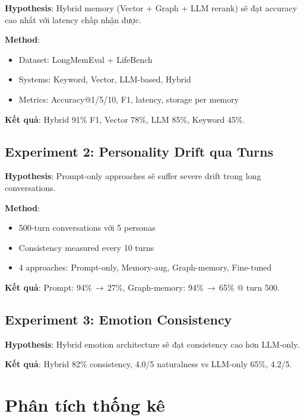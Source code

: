 \documentclass[10pt,leqno]{amsart}
\begin{document}
\textbf{Hypothesis}: Hybrid memory (Vector + Graph + LLM rerank) sẽ đạt accuracy cao nhất với latency chấp nhận được.

\textbf{Method}:
\begin{itemize}
    \item Dataset: LongMemEval + LifeBench
    \item Systems: Keyword, Vector, LLM-based, Hybrid
    \item Metrics: Accuracy@1/5/10, F1, latency, storage per memory
\end{itemize}

\textbf{Kết quả}: Hybrid 91\% F1, Vector 78\%, LLM 85\%, Keyword 45\%.

\subsection{Experiment 2: Personality Drift qua Turns}

\textbf{Hypothesis}: Prompt-only approaches sẽ suffer severe drift trong long conversations.

\textbf{Method}:
\begin{itemize}
    \item 500-turn conversations với 5 personas
    \item Consistency measured every 10 turns
    \item 4 approaches: Prompt-only, Memory-aug, Graph-memory, Fine-tuned
\end{itemize}

\textbf{Kết quả}: Prompt: 94\%\,$\to$\,27\%, Graph-memory: 94\%\,$\to$\,65\% @ turn 500.

\subsection{Experiment 3: Emotion Consistency}

\textbf{Hypothesis}: Hybrid emotion architecture sẽ đạt consistency cao hơn LLM-only.

\textbf{Kết quả}: Hybrid 82\% consistency, 4.0/5 naturalness vs LLM-only 65\%, 4.2/5.


\section{Phân tích thống kê}
\end{document}
